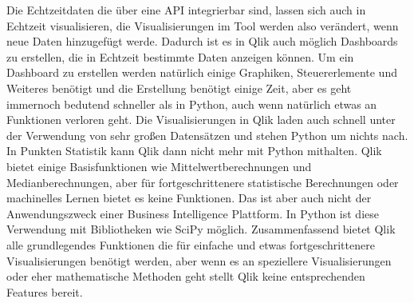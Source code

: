 \documentclass[12pt]{article}
\begin{document}
	Die Echtzeitdaten die über eine API integrierbar sind, lassen sich auch in Echtzeit visualisieren, die Visualisierungen im Tool werden also verändert, wenn neue Daten hinzugefügt werde. Dadurch ist es in Qlik auch möglich Dashboards zu erstellen, die in Echtzeit bestimmte Daten anzeigen können. Um ein Dashboard zu erstellen werden natürlich einige Graphiken, Steuererlemente und Weiteres benötigt und die Erstellung benötigt einige Zeit, aber es geht immernoch bedutend schneller als in Python, auch wenn natürlich etwas an Funktionen verloren geht.
	Die Visualisierungen in Qlik laden auch schnell unter der Verwendung von sehr großen Datensätzen und stehen Python um nichts nach.
	In Punkten Statistik kann Qlik dann nicht mehr mit Python mithalten. Qlik bietet einige Basisfunktionen wie Mittelwertberechnungen und Medianberechnungen, aber für fortgeschrittenere statistische Berechnungen oder machinelles Lernen bietet es keine Funktionen. Das ist aber auch nicht der Anwendungszweck einer Business Intelligence Plattform. In Python ist diese Verwendung mit Bibliotheken wie SciPy möglich.
	Zusammenfassend bietet Qlik alle grundlegendes Funktionen die für einfache und etwas fortgeschrittenere Visualisierungen benötigt werden, aber wenn es an speziellere Visualisierungen oder eher mathematische Methoden geht stellt Qlik keine entsprechenden Features bereit.
	
\end{document}
